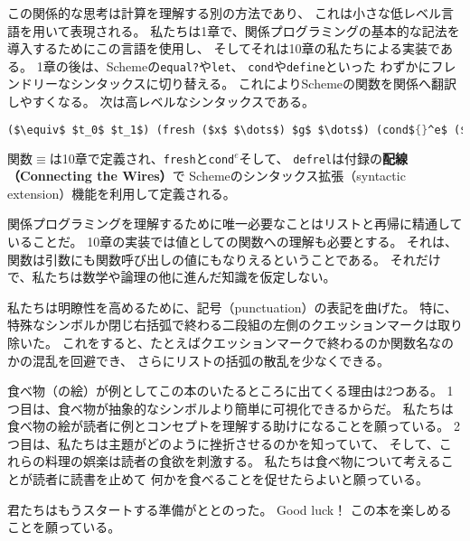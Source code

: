 \documentclass[uplatex, dvipdfmx, ja=standard, a6paper, 9pt]{bxjsarticle}
\begin{document}
この関係的な思考は計算を理解する別の方法であり、
これは小さな低レベル言語を用いて表現される。
私たちは1章で、関係プログラミングの基本的な記法を導入するためにこの言語を使用し、
そしてそれは10章の私たちによる実装である。
1章の後は、Schemeの\lstinline|equal?|や\lstinline|let|、
\lstinline|cond|や\lstinline|define|といった
わずかにフレンドリーなシンタックスに切り替える。
これによりSchemeの関数を関係へ翻訳しやすくなる。
次は高レベルなシンタックスである。

\begin{minipage}{\linewidth}
\begin{lstlisting}[language=Scheme, mathescape]
($\equiv$ $t_0$ $t_1$) (fresh ($x$ $\dots$) $g$ $\dots$) (cond${}^e$ ($g$ $\dots$) $\dots$) (defrel ($name$ $x$ $\dots$) $g$ $\dots$)  
\end{lstlisting}
\end{minipage}

関数$\equiv$は10章で定義され、\lstinline|fresh|と\lstinline|cond|${}^e$そして、
\lstinline|defrel|は付録の\textbf{配線（Connecting the Wires）}で
Schemeのシンタックス拡張（syntactic extension）機能を利用して定義される。

関係プログラミングを理解するために唯一必要なことはリストと再帰に精通していることだ。
10章の実装では値としての関数への理解も必要とする。
それは、関数は引数にも関数呼び出しの値にもなりえるということである。
それだけで、私たちは数学や論理の他に進んだ知識を仮定しない。

私たちは明瞭性を高めるために、記号（punctuation）の表記を曲げた。
特に、特殊なシンボルか閉じ右括弧で終わる二段組の左側のクエッションマークは取り除いた。
これをすると、たとえばクエッションマークで終わるのか関数名なのかの混乱を回避でき、
さらにリストの括弧の散乱を少なくできる。

食べ物（の絵）が例としてこの本のいたるところに出てくる理由は2つある。
1つ目は、食べ物が抽象的なシンボルより簡単に可視化できるからだ。
私たちは食べ物の絵が読者に例とコンセプトを理解する助けになることを願っている。
2つ目は、私たちは主題がどのように挫折させるのかを知っていて、
そして、これらの料理の娯楽は読者の食欲を刺激する。
私たちは食べ物について考えることが読者に読書を止めて
何かを食べることを促せたらよいと願っている。

君たちはもうスタートする準備がととのった。
Good luck！
この本を楽しめることを願っている。
\end{document}
